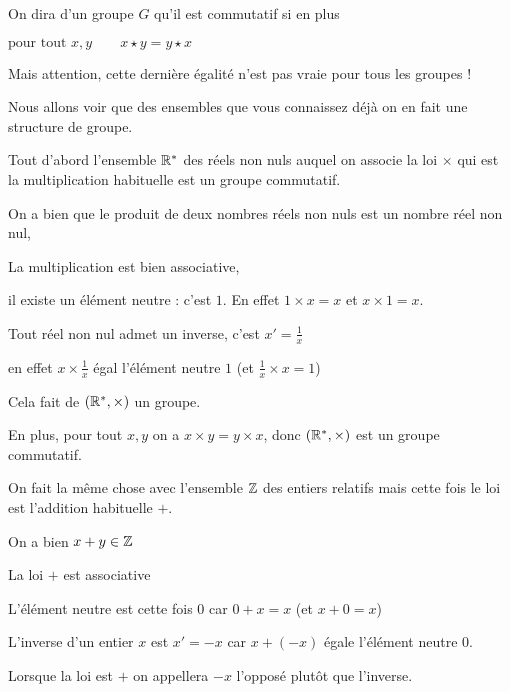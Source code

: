 On dira d'un groupe $G$ qu'il est commutatif si en plus

$\text{pour tout } x,y   \qquad x \star y = y \star x$

Mais attention, cette dernière égalité n'est pas vraie pour tous les groupes !


\diapo

Nous allons voir que des ensembles que vous connaissez déjà on en fait
une structure de groupe.

Tout d'abord l'ensemble $\mathbb{R}^*$ des réels non nuls auquel on associe la loi $\times$ qui est la multiplication
habituelle est un groupe commutatif.

\change

On a bien que le produit de deux nombres réels non nuls est un nombre réel non nul,

\change

La multiplication est bien associative,

\change

il existe un élément neutre : c'est $1$. En effet $1\times x=x$
et $x\times 1 = x$.

\change


Tout réel non nul admet un inverse, c'est $x'= \frac{1}{x}$ 

en effet $x \times \frac{1}{x}$ égal l'élément neutre $1$ (et $\frac{1}{x}\times x=1$)


Cela fait de $(\mathbb{R}^*,\times)$ un groupe.

\change

En plus, pour tout $x,y$ on a $x\times y=y\times x$,
donc  $(\mathbb{R}^*,\times)$ est un groupe commutatif.


\change

On fait la même chose avec l'ensemble $\mathbb{Z}$ des entiers relatifs mais cette fois
le loi est l'addition habituelle $+$.

\change

On a bien $x+y \in \mathbb{Z}$

\change

La loi $+$ est associative

\change

L'élément neutre est cette fois $0$ car $0+x=x$ (et $x+0=x$)

\change

L'inverse d'un entier $x$ est $x'=-x$ car $x+(-x)$ égale l'élément neutre $0$.

Lorsque la loi est $+$ on appellera $-x$ l'opposé plutôt que l'inverse.

